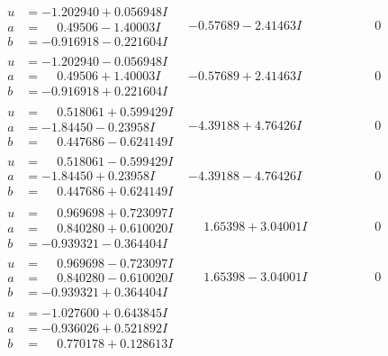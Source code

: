 \documentclass[1p]{elsarticle_modified}
\theoremstyle{definition}
\begin{document}
$$\begin{array}{c|c|c}
\begin{aligned}
u &= -1.202940 + 0.056948 I \\
a &= \phantom{-}0.49506 - 1.40003 I \\
b &= -0.916918 - 0.221604 I\end{aligned}
 & -0.57689 - 2.41463 I & \phantom{-0.000000 } 0 \\ \hline\begin{aligned}
u &= -1.202940 - 0.056948 I \\
a &= \phantom{-}0.49506 + 1.40003 I \\
b &= -0.916918 + 0.221604 I\end{aligned}
 & -0.57689 + 2.41463 I & \phantom{-0.000000 } 0 \\ \hline\begin{aligned}
u &= \phantom{-}0.518061 + 0.599429 I \\
a &= -1.84450 - 0.23958 I \\
b &= \phantom{-}0.447686 - 0.624149 I\end{aligned}
 & -4.39188 + 4.76426 I & \phantom{-0.000000 } 0 \\ \hline\begin{aligned}
u &= \phantom{-}0.518061 - 0.599429 I \\
a &= -1.84450 + 0.23958 I \\
b &= \phantom{-}0.447686 + 0.624149 I\end{aligned}
 & -4.39188 - 4.76426 I & \phantom{-0.000000 } 0 \\ \hline\begin{aligned}
u &= \phantom{-}0.969698 + 0.723097 I \\
a &= \phantom{-}0.840280 + 0.610020 I \\
b &= -0.939321 - 0.364404 I\end{aligned}
 & \phantom{-}1.65398 + 3.04001 I & \phantom{-0.000000 } 0 \\ \hline\begin{aligned}
u &= \phantom{-}0.969698 - 0.723097 I \\
a &= \phantom{-}0.840280 - 0.610020 I \\
b &= -0.939321 + 0.364404 I\end{aligned}
 & \phantom{-}1.65398 - 3.04001 I & \phantom{-0.000000 } 0 \\ \hline\begin{aligned}
u &= -1.027600 + 0.643845 I \\
a &= -0.936026 + 0.521892 I \\
b &= \phantom{-}0.770178 + 0.128613 I\end{aligned}

\end{array}$$
\end{document}
